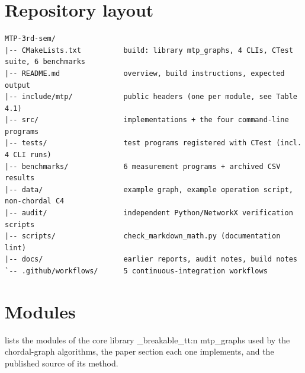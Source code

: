 \documentclass[11pt,a4paper,oneside]{report}
\theoremstyle{plain}
\theoremstyle{definition}
\theoremstyle{remark}
\DeclareRobustCommand{\code}[1]{\mtp_breakable_tt:n {#1}}
\begin{document}
\section{Repository layout}
\begin{lstlisting}[style=shell,caption={Top-level layout of the repository (the build directory
is not part of the repository).},label={lst:tree}]
MTP-3rd-sem/
|-- CMakeLists.txt          build: library mtp_graphs, 4 CLIs, CTest suite, 6 benchmarks
|-- README.md               overview, build instructions, expected output
|-- include/mtp/            public headers (one per module, see Table 4.1)
|-- src/                    implementations + the four command-line programs
|-- tests/                  test programs registered with CTest (incl. 4 CLI runs)
|-- benchmarks/             6 measurement programs + archived CSV results
|-- data/                   example graph, example operation script, non-chordal C4
|-- audit/                  independent Python/NetworkX verification scripts
|-- scripts/                check_markdown_math.py (documentation lint)
|-- docs/                   earlier reports, audit notes, build notes
`-- .github/workflows/      5 continuous-integration workflows
\end{lstlisting}

\section{Modules}
 lists the modules of the core library \code{mtp_graphs} used by the
chordal-graph algorithms, the paper section each one implements, and the published source of
its method.
\end{document}
